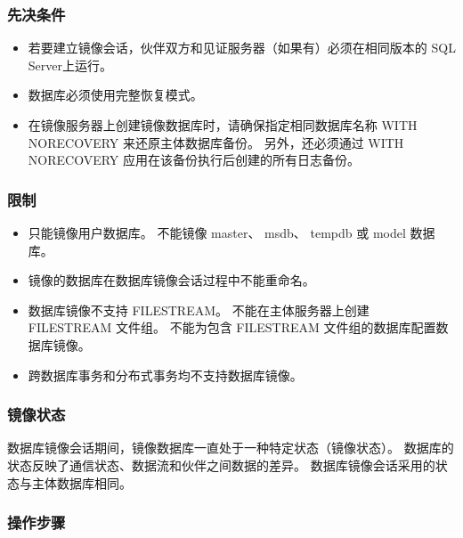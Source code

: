 \documentclass[onecolumn,oneside]{BUPTHomework}
\begin{document}
  \subsubsection{先决条件}

  \begin{itemize}
    \item 若要建立镜像会话，伙伴双方和见证服务器（如果有）必须在相同版本的 SQL Server上运行。
    \item 数据库必须使用完整恢复模式。
    \item 在镜像服务器上创建镜像数据库时，请确保指定相同数据库名称 WITH NORECOVERY 来还原主体数据库备份。 另外，还必须通过 WITH NORECOVERY 应用在该备份执行后创建的所有日志备份。
  \end{itemize}

  \subsubsection{限制}

  \begin{itemize}
    \item 只能镜像用户数据库。 不能镜像 master、 msdb、 tempdb 或 model 数据库。
    \item 镜像的数据库在数据库镜像会话过程中不能重命名。
    \item 数据库镜像不支持 FILESTREAM。 不能在主体服务器上创建 FILESTREAM 文件组。 不能为包含 FILESTREAM 文件组的数据库配置数据库镜像。
    \item 跨数据库事务和分布式事务均不支持数据库镜像。
  \end{itemize}

  \subsubsection{镜像状态}

  数据库镜像会话期间，镜像数据库一直处于一种特定状态（镜像状态）。
  数据库的状态反映了通信状态、数据流和伙伴之间数据的差异。
  数据库镜像会话采用的状态与主体数据库相同。

  \subsubsection{操作步骤}
\end{document}
